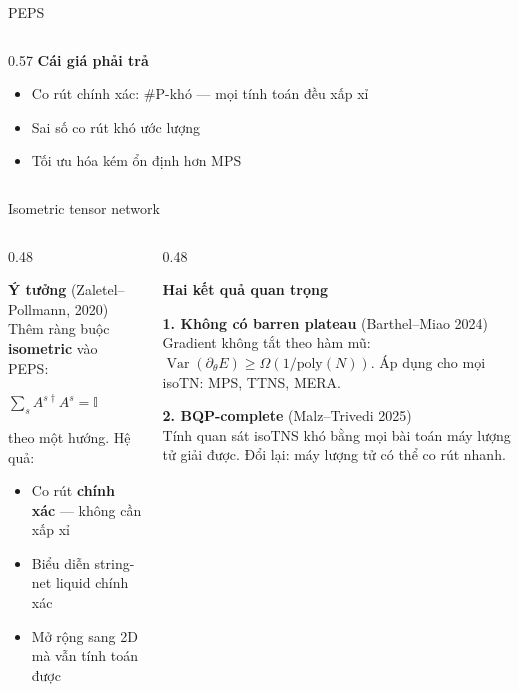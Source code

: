 \documentclass[aspectratio=169, 11pt]{beamer}
\newcommand{\warn}[1]{\textcolor{qamber}{#1}}
\newcommand{\good}[1]{\textcolor{qgreen}{#1}}
\newcommand{\eqn}[1]{\begin{center}\colorbox{eqbox}{\color{qcyan}$\displaystyle #1$}\end{center}}
\begin{document}
\begin{frame}[shrink=3]{PEPS}
\begin{columns}[T]
\begin{column}{0.57\textwidth}
\vspace{6pt}
\textcolor{qpink}{\textbf{Cái giá phải trả}}\\[3pt]
{\small
\begin{itemize}
  \item Co rút chính xác: \warn{\#P-khó} — mọi tính toán đều xấp xỉ
  \item Sai số co rút khó ước lượng
  \item Tối ưu hóa kém ổn định hơn MPS
\end{itemize}}

\end{column}
\end{columns}

\end{frame}

\begin{frame}[shrink=3]{Isometric tensor network}

\begin{columns}[T]
\begin{column}{0.48\textwidth}

\textcolor{qgreen}{\textbf{Ý tưởng}} (Zaletel--Pollmann, 2020)\\[3pt]
{\small Thêm ràng buộc \textbf{isometric} vào PEPS:}
\eqn{\sum_s A^{s\dagger}A^s = \mathbb{I}}
{\small theo một hướng. Hệ quả:
\begin{itemize}
  \item Co rút \textbf{chính xác} — không cần xấp xỉ
  \item Biểu diễn string-net liquid chính xác
  \item Mở rộng sang 2D mà vẫn tính toán được
\end{itemize}}

\end{column}
\begin{column}{0.48\textwidth}

\textcolor{qgreen}{\textbf{Hai kết quả quan trọng}}

\vspace{6pt}
{\small
\good{\textbf{1. Không có barren plateau}} (Barthel--Miao 2024)\\[2pt]
{\footnotesize Gradient không tắt theo hàm mũ:
$\operatorname{Var}(\partial_\theta E)\geq\Omega(1/\mathrm{poly}(N))$.
Áp dụng cho mọi isoTN: MPS, TTNS, MERA.}

\vspace{8pt}
\warn{\textbf{2. BQP-complete}} (Malz--Trivedi 2025)\\[2pt]
{\footnotesize Tính quan sát isoTNS khó bằng mọi bài toán máy lượng tử giải được. Đổi lại: máy lượng tử có thể co rút nhanh.}
}

\end{column}
\end{columns}

\end{frame}
\end{document}
